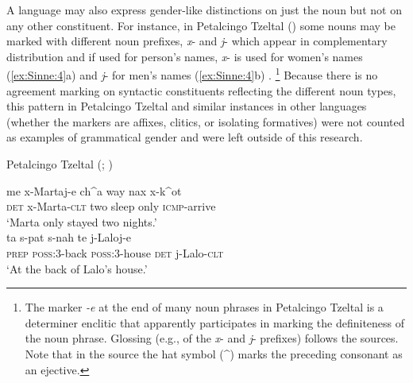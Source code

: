 \documentclass[output=collectionpaper]{langsci/langscibook}
\begin{document}
A language may also express gender-like distinctions on just the noun but not on any other constituent. For instance, in Petalcingo Tzeltal () some nouns may be marked with different noun prefixes, \textit{x}{}- and \textit{j}{}- which appear in complementary distribution and if used for person's names, \textit{x}{}- is used for women's names (\ref{ex:Sinne:4}a) and \textit{j}{}- for men's names (\ref{ex:Sinne:4}b) \citep[20]{Shklovsky2005}.%
\footnote{The marker \textit{{}-e} at the end of many noun phrases in Petalcingo Tzeltal is a determiner enclitic \citep[127]{Shklovsky2012} that apparently participates in marking the definiteness of the noun phrase. Glossing (e.g., of the \textit{x}{}- and \textit{j}{}- prefixes) follows the sources. Note that in the source the hat symbol (\^{}) marks the preceding consonant as an ejective.} %
Because there is no agreement marking on syntactic constituents reflecting the different noun types, this pattern in Petalcingo Tzeltal and similar instances in other languages (whether the markers are affixes, clitics, or isolating formatives) were not counted as examples of grammatical gender and were left outside of this research.

\ea
\label{ex:Sinne:4}
Petalcingo Tzeltal (; \citealt[20]{Shklovsky2005})\\
\begin{xlist}
\ex
\gll me x-Martaj-e ch\^{}a way nax x-k\^{}ot\\
\textsc{det} x{}-Marta-\textsc{clt} two sleep only \textsc{icmp}{}-arrive\\
\glt `Marta only stayed two nights.'\\
\ex
\gll ta s-pat s-nah te j-Laloj-e\\
\textsc{prep} \textsc{poss}:3-back \textsc{poss}:3-house \textsc{det} j{}-Lalo-\textsc{clt}\\
\glt `At the back of Lalo's house.'\\
\end{xlist}
\z
\end{document}
